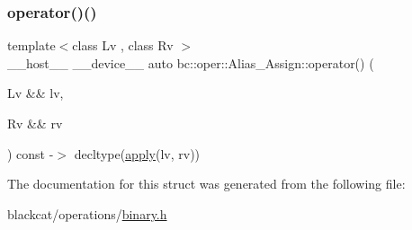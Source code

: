 \mbox{\label{structbc_1_1oper_1_1Alias__Assign_aeb048124a57b7e7ad877cf5abbfc3162}} 
\subsubsection{\texorpdfstring{operator()()}{operator()()}}
{\footnotesize\ttfamily template$<$class Lv , class Rv $>$ \\
\+\_\+\+\_\+host\+\_\+\+\_\+ \+\_\+\+\_\+device\+\_\+\+\_\+ auto bc\+::oper\+::\+Alias\+\_\+\+Assign\+::operator() (\begin{DoxyParamCaption}\item[{Lv \&\&}]{lv,  }\item[{Rv \&\&}]{rv }\end{DoxyParamCaption}) const -\/$>$ decltype(\hyperlink{structbc_1_1oper_1_1Alias__Assign_ae64d52d432b301777f6e22cd57eb67b0}{apply}(lv, rv)) \hspace{0.3cm}{\ttfamily [inline]}}



The documentation for this struct was generated from the following file\+:\begin{DoxyCompactItemize}
\item 
blackcat/operations/\hyperlink{binary_8h}{binary.\+h}\end{DoxyCompactItemize}
